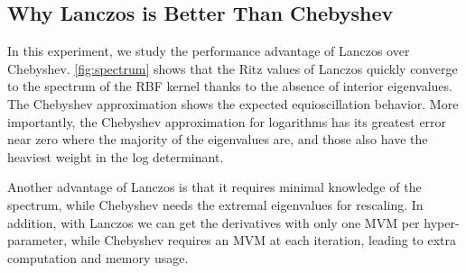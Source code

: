 \subsection{Why Lanczos is Better Than Chebyshev}\label{sup:lanczoscheb}

In this experiment, we study the performance advantage of Lanczos over
Chebyshev. \cref{fig:spectrum} shows that the Ritz values of Lanczos quickly
converge to the spectrum of the RBF kernel thanks to the absence of interior
eigenvalues. The Chebyshev approximation shows the expected equioscillation
behavior. More importantly, the Chebyshev approximation for logarithms has its
greatest error near zero where the majority of the eigenvalues are, and those
also have the heaviest weight in the log determinant.

Another advantage of Lanczos is that it requires minimal knowledge of the
spectrum, while Chebyshev needs the extremal eigenvalues for rescaling. In
addition, with Lanczos we can get the derivatives with only one MVM per 
hyper\hyp{}parameter, while Chebyshev requires an MVM at each iteration, leading
to extra computation and memory usage.

